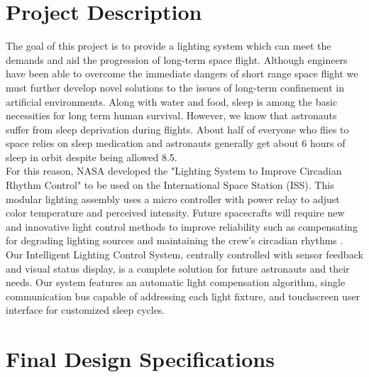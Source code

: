 \documentclass[12pt,a4paper]{report}
\begin{document}
\section{Project Description}
The goal of this project is to provide a lighting system which can meet the demands and aid the progression of long-term space flight. Although engineers have been able to overcome the immediate dangers of short range space flight we must further develop novel solutions to the issues of long-term confinement in artificial environments. Along with water and food, sleep is among the basic necessities for long term human survival. However, we know that astronauts suffer from sleep deprivation during flights. About half of everyone who flies to space relies on sleep medication and astronauts generally get about 6 hours of sleep in orbit despite being allowed 8.5.\cite{spacesleep}\\ \linebreak 
For this reason, NASA developed the "Lighting System to Improve Circadian Rhythm Control" to be used on the International Space Station (ISS). \cite{nasapatent} This modular lighting assembly uses a micro controller with power relay to adjust color temperature and perceived intensity. Future spacecrafts will require new and innovative light control methods to improve reliability such as compensating for degrading lighting sources and maintaining the crew's circadian rhythms \cite{tsgc}. \\ \linebreak
Our Intelligent Lighting Control System, centrally controlled with sensor feedback and visual status display, is a complete solution for future astronauts and their needs. Our system features an automatic light compensation algorithm, single communication bus capable of addressing each light fixture, and touchscreen user interface for customized sleep cycles. 



\section{Final Design Specifications}
\end{document}

